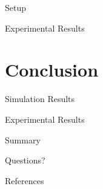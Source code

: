 \documentclass[10pt]{beamer}
\begin{document}
\begin{frame}{Setup}
\end{frame}

\begin{frame}{Experimental Results}
\end{frame}


\section{Conclusion}

\begin{frame}{Simulation Results}
\end{frame}

\begin{frame}{Experimental Results}
\end{frame}

\begin{frame}{Summary}
\end{frame}

\begin{frame}[standout]
  Questions?
\end{frame}

\appendix

\begin{frame}[allowframebreaks]{References}

  
  

\end{frame}
\end{document}
